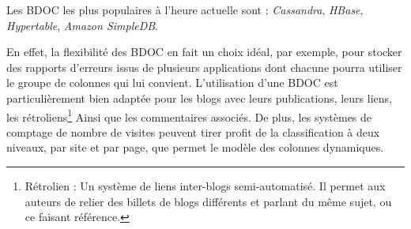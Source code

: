 \documentclass[12pt]{article}
\begin{document}
Les BDOC les plus populaires à l'heure actuelle sont : \emph{Cassandra}, \emph{HBase}, \emph{Hypertable}, \emph{Amazon SimpleDB}.
\par
En effet, la flexibilité des BDOC en fait un choix idéal, par exemple, pour stocker des rapports d'erreurs issus de plusieurs applications dont chacune pourra utiliser le groupe de colonnes qui lui convient. L'utilisation d'une BDOC est particulièrement bien adaptée pour les blogs avec leurs publications, leurs liens, les rétroliens\footnote{Rétrolien : Un système de liens inter-blogs semi-automatisé. Il permet aux auteurs de relier des billets de blogs différents et parlant du même sujet, ou ce faisant référence.} Ainsi que les commentaires associés. De plus, les systèmes de comptage de nombre de visites peuvent tirer profit de la classification à deux niveaux, par site et par page, que permet le modèle des colonnes dynamiques.
\end{document}
